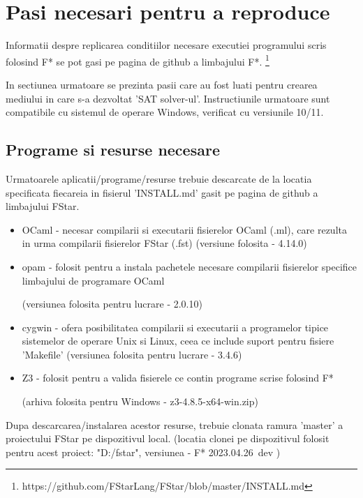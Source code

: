\chapter{Pasi necesari pentru a reproduce}

Informatii despre replicarea conditiilor necesare executiei programului scris folosind F* se pot gasi pe pagina de github a limbajului F*. \footnote{https://github.com/FStarLang/FStar/blob/master/INSTALL.md}

In sectiunea urmatoare se prezinta pasii care au fost luati pentru crearea \newline mediului in care s-a dezvoltat 'SAT solver-ul'. Instructiunile urmatoare sunt \newline compatibile cu sistemul de operare Windows, verificat cu versiunile 10/11. 

\section{Programe si resurse necesare}

Urmatoarele aplicatii/programe/resurse trebuie descarcate de la locatia specificata fiecareia in fisierul 'INSTALL.md' gasit pe pagina de github a limbajului FStar.

\begin{itemize}
 \item OCaml - necesar compilarii si executarii fisierelor OCaml (.ml), care rezulta in urma compilarii fisierelor FStar (.fst)
	(versiune folosita - 4.14.0)
 \item opam - folosit pentru a instala pachetele necesare compilarii fisierelor specifice limbajului de programare OCaml 
 
 (versiunea folosita pentru lucrare - 2.0.10)
 \item cygwin - ofera posibilitatea compilarii si executarii a programelor tipice \newline sistemelor de operare Unix si Linux, ceea ce include suport pentru fisiere \newline  'Makefile' 
 (versiunea folosita pentru lucrare - 3.4.6)
 \item Z3 - folosit pentru a valida fisierele ce contin programe scrise folosind F*
 

 
 (arhiva folosita pentru Windows - z3-4.8.5-x64-win.zip)
\end{itemize}

\newpage


Dupa descarcarea/instalarea acestor resurse, trebuie clonata ramura 'master' a proiectului FStar pe dispozitivul local. (locatia clonei pe dispozitivul folosit pentru acest proiect: "D:/fstar", versiunea  - F* 2023.04.26~dev )

